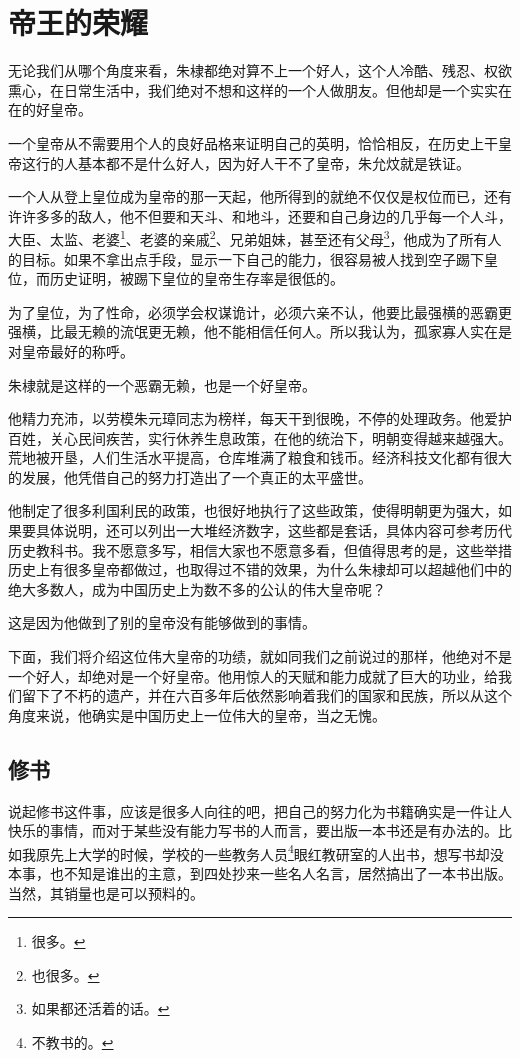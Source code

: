 \section{帝王的荣耀}
\ifnum{}
	\begin{multicols}{\theparacolNo}
\fi
无论我们从哪个角度来看，朱棣都绝对算不上一个好人，这个人冷酷、残忍、权欲熏心，在日常生活中，我们绝对不想和这样的一个人做朋友。但他却是一个实实在在的好皇帝。

一个皇帝从不需要用个人的良好品格来证明自己的英明，恰恰相反，在历史上干皇帝这行的人基本都不是什么好人，因为好人干不了皇帝，朱允炆就是铁证。

一个人从登上皇位成为皇帝的那一天起，他所得到的就绝不仅仅是权位而已，还有许许多多的敌人，他不但要和天斗、和地斗，还要和自己身边的几乎每一个人斗，大臣、太监、老婆\footnote{很多。}、老婆的亲戚\footnote{也很多。}、兄弟姐妹，甚至还有父母\footnote{如果都还活着的话。}，他成为了所有人的目标。如果不拿出点手段，显示一下自己的能力，很容易被人找到空子踢下皇位，而历史证明，被踢下皇位的皇帝生存率是很低的。

为了皇位，为了性命，必须学会权谋诡计，必须六亲不认，他要比最强横的恶霸更强横，比最无赖的流氓更无赖，他不能相信任何人。所以我认为，孤家寡人实在是对皇帝最好的称呼。

朱棣就是这样的一个恶霸无赖，也是一个好皇帝。

他精力充沛，以劳模朱元璋同志为榜样，每天干到很晚，不停的处理政务。他爱护百姓，关心民间疾苦，实行休养生息政策，在他的统治下，明朝变得越来越强大。荒地被开垦，人们生活水平提高，仓库堆满了粮食和钱币。经济科技文化都有很大的发展，他凭借自己的努力打造出了一个真正的太平盛世。

他制定了很多利国利民的政策，也很好地执行了这些政策，使得明朝更为强大，如果要具体说明，还可以列出一大堆经济数字，这些都是套话，具体内容可参考历代历史教科书。我不愿意多写，相信大家也不愿意多看，但值得思考的是，这些举措历史上有很多皇帝都做过，也取得过不错的效果，为什么朱棣却可以超越他们中的绝大多数人，成为中国历史上为数不多的公认的伟大皇帝呢？

这是因为他做到了别的皇帝没有能够做到的事情。

下面，我们将介绍这位伟大皇帝的功绩，就如同我们之前说过的那样，他绝对不是一个好人，却绝对是一个好皇帝。他用惊人的天赋和能力成就了巨大的功业，给我们留下了不朽的遗产，并在六百多年后依然影响着我们的国家和民族，所以从这个角度来说，他确实是中国历史上一位伟大的皇帝，当之无愧。

\subsection{修书}
说起修书这件事，应该是很多人向往的吧，把自己的努力化为书籍确实是一件让人快乐的事情，而对于某些没有能力写书的人而言，要出版一本书还是有办法的。比如我原先上大学的时候，学校的一些教务人员\footnote{不教书的。}眼红教研室的人出书，想写书却没本事，也不知是谁出的主意，到四处抄来一些名人名言，居然搞出了一本书出版。当然，其销量也是可以预料的。


\end{multicols}
